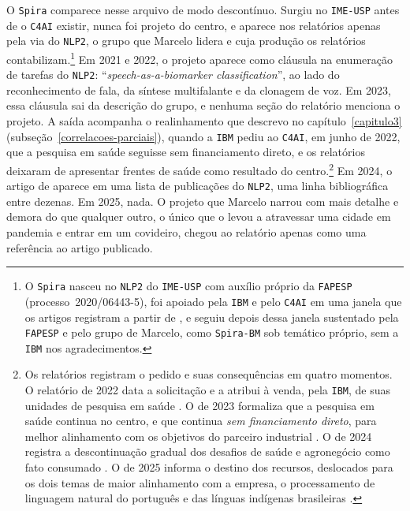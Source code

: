 O \texttt{Spira} comparece nesse arquivo de modo descontínuo. Surgiu no \texttt{IME-USP} antes de o \texttt{C4AI} existir, nunca foi projeto do centro, e aparece nos relatórios apenas pela via do \texttt{NLP2}, o grupo que Marcelo lidera e cuja produção os relatórios contabilizam.\footnote{O \texttt{Spira} nasceu no \texttt{NLP2} do \texttt{IME-USP} com auxílio próprio da \texttt{FAPESP} (processo~2020/06443-5), foi apoiado pela \texttt{IBM} e pelo \texttt{C4AI} em uma janela que os artigos registram a partir de \textcite{Gauy2024Discriminant}, e seguiu depois dessa janela sustentado pela \texttt{FAPESP} e pelo grupo de Marcelo, como \texttt{Spira-BM} sob temático próprio, sem a \texttt{IBM} nos agradecimentos.} Em 2021 e 2022, o projeto aparece como cláusula na enumeração de tarefas do \texttt{NLP2}: \enquote{\textit{speech-as-a-biomarker classification}}, ao lado do reconhecimento de fala, da síntese multifalante e da clonagem de voz. Em 2023, essa cláusula sai da descrição do grupo, e nenhuma seção do relatório menciona o projeto. A saída acompanha o realinhamento que descrevo no capítulo~\ref{capitulo3} (subseção~\ref{correlacoes-parciais}), quando a \texttt{IBM} pediu ao \texttt{C4AI}, em junho de 2022, que a pesquisa em saúde seguisse sem financiamento direto, e os relatórios deixaram de apresentar frentes de saúde como resultado do centro.\footnote{Os relatórios registram o pedido e suas consequências em quatro momentos. O relatório de 2022 data a solicitação e a atribui à venda, pela \texttt{IBM}, de suas unidades de pesquisa em saúde \parencite[p.~9]{C4AI2022}. O de 2023 formaliza que a pesquisa em saúde continua no centro, e que continua \emph{sem financiamento direto}, para melhor alinhamento com os objetivos do parceiro industrial \parencite[p.~12]{C4AI2023}. O de 2024 registra a descontinuação gradual dos desafios de saúde e agronegócio como fato consumado \parencite[p.~10]{C4AI2024}. O de 2025 informa o destino dos recursos, deslocados para os dois temas de maior alinhamento com a empresa, o processamento de linguagem natural do português e das línguas indígenas brasileiras \parencite[p.~20]{C4AI2025}.} Em 2024, o artigo de \textcite{Gauy2024Discriminant} aparece em uma lista de publicações do \texttt{NLP2}, uma linha bibliográfica entre dezenas. Em 2025, nada. O projeto que Marcelo narrou com mais detalhe e demora do que qualquer outro, o único que o levou a atravessar uma cidade em pandemia e entrar em um covideiro, chegou ao relatório apenas como uma referência ao artigo publicado.


